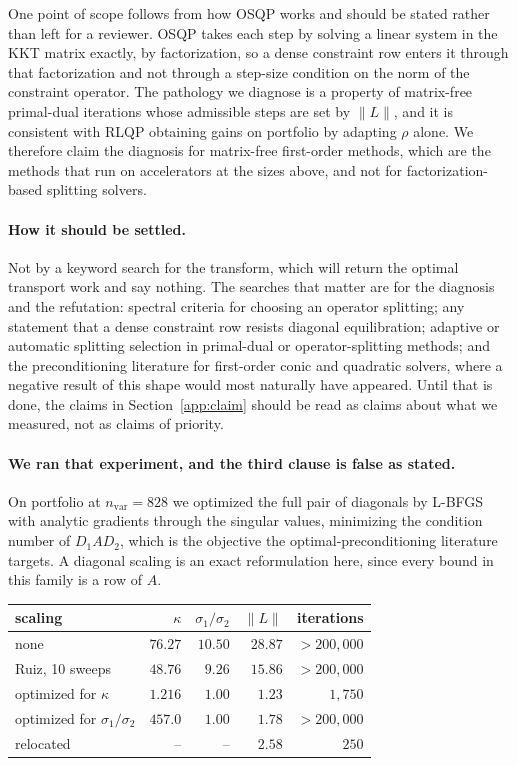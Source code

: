 \documentclass[11pt]{article}
\begin{document}
One point of scope follows from how OSQP works and should be stated rather
than left for a reviewer. OSQP takes each step by solving a linear system in
the KKT matrix exactly, by factorization, so a dense constraint row enters it
through that factorization and not through a step-size condition on the norm
of the constraint operator. The pathology we diagnose is a property of
matrix-free primal-dual iterations whose admissible steps are set by $\|L\|$,
and it is consistent with RLQP obtaining gains on portfolio by adapting $\rho$
alone. We therefore claim the diagnosis for matrix-free first-order methods,
which are the methods that run on accelerators at the sizes above, and not for
factorization-based splitting solvers.

\paragraph{How it should be settled.}
Not by a keyword search for the transform, which will return the optimal
transport work and say nothing. The searches that matter are for the
diagnosis and the refutation: spectral criteria for choosing an operator
splitting; any statement that a dense constraint row resists diagonal
equilibration; adaptive or automatic splitting selection in primal-dual or
operator-splitting methods; and the preconditioning literature for
first-order conic and quadratic solvers, where a negative result of this shape
would most naturally have appeared. Until that is done, the claims in
Section~\ref{app:claim} should be read as claims about what we measured, not
as claims of priority.

\paragraph{We ran that experiment, and the third clause is false as stated.}
On portfolio at $n_{\mathrm{var}} = 828$ we optimized the full pair of
diagonals by L-BFGS with analytic gradients through the singular values,
minimizing the condition number of $D_1 A D_2$, which is the objective the
optimal-preconditioning literature targets. A diagonal scaling is an exact
reformulation here, since every bound in this family is a row of $A$.

\begin{center}
\begin{tabular}{lrrrr}
\toprule
scaling & $\kappa$ & $\sigma_1/\sigma_2$ & $\|L\|$ & iterations \\
\midrule
none                       & $76.27$   & $10.50$ & $28.87$ & $>200{,}000$ \\
Ruiz, 10 sweeps            & $48.76$   & $9.26$  & $15.86$ & $>200{,}000$ \\
optimized for $\kappa$      & $1.216$   & $1.00$  & $1.23$  & $1{,}750$ \\
optimized for $\sigma_1/\sigma_2$ & $457.0$ & $1.00$ & $1.78$ & $>200{,}000$ \\
relocated                  & --        & --      & $2.58$  & $250$ \\
\bottomrule
\end{tabular}
\end{center}
\end{document}
